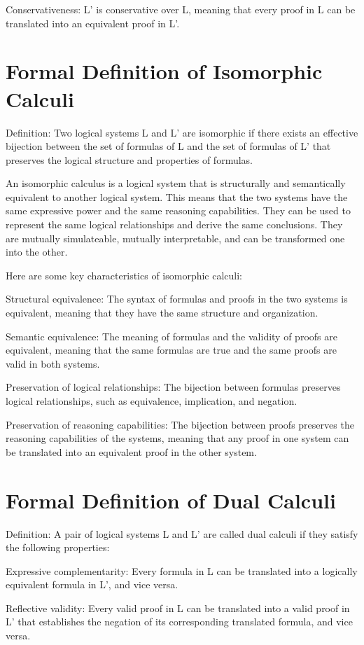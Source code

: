 Conservativeness: L' is conservative over L, meaning that every proof in L can be translated into an equivalent proof in L'.


\section{Formal Definition of Isomorphic Calculi}
Definition: Two logical systems L and L' are isomorphic if there exists an effective bijection between the set of formulas of L and the set of formulas of L' that preserves the logical structure and properties of formulas. 

An isomorphic calculus is a logical system that is structurally and semantically equivalent to another logical system. This means that the two systems have the same expressive power and the same reasoning capabilities. They can be used to represent the same logical relationships and derive the same conclusions. They are mutually simulateable, mutually interpretable, and can be transformed one into the other.

Here are some key characteristics of isomorphic calculi:

Structural equivalence: The syntax of formulas and proofs in the two systems is equivalent, meaning that they have the same structure and organization.

Semantic equivalence: The meaning of formulas and the validity of proofs are equivalent, meaning that the same formulas are true and the same proofs are valid in both systems.

Preservation of logical relationships: The bijection between formulas preserves logical relationships, such as equivalence, implication, and negation.

Preservation of reasoning capabilities: The bijection between proofs preserves the reasoning capabilities of the systems, meaning that any proof in one system can be translated into an equivalent proof in the other system.

\section{Formal Definition of Dual Calculi}
Definition: A pair of logical systems L and L' are called dual calculi if they satisfy the following properties:

Expressive complementarity: Every formula in L can be translated into a logically equivalent formula in L', and vice versa.

Reflective validity: Every valid proof in L can be translated into a valid proof in L' that establishes the negation of its corresponding translated formula, and vice versa.

